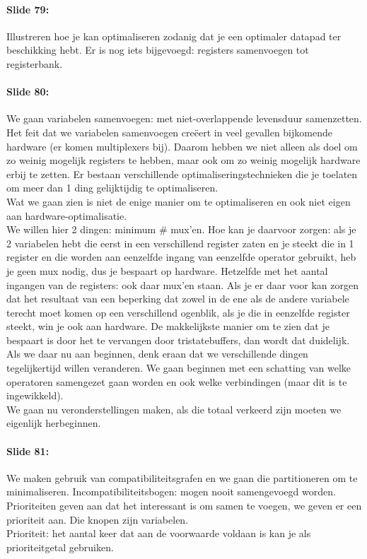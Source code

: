 \documentclass[10pt,a4paper]{book}
\begin{document}
\paragraph{Slide 79:} Illustreren hoe je kan optimaliseren zodanig dat je een optimaler datapad ter beschikking hebt. Er is nog iets bijgevoegd: registers samenvoegen tot registerbank.

\paragraph{Slide 80:} We gaan variabelen samenvoegen: met niet-overlappende levensduur samenzetten. Het feit dat we variabelen samenvoegen cre\"eert in veel gevallen bijkomende hardware (er komen multiplexers bij). Daarom hebben we niet alleen als doel om zo weinig mogelijk registers te hebben, maar ook om zo weinig mogelijk hardware erbij te zetten. Er bestaan verschillende optimaliseringstechnieken die je toelaten om meer dan 1 ding gelijktijdig te optimaliseren.\\
Wat we gaan zien is niet de enige manier om te optimaliseren en ook niet eigen aan hardware-optimalisatie.\\
We willen hier 2 dingen: minimum \# mux'en. Hoe kan je daarvoor zorgen: als je 2 variabelen hebt die eerst in een verschillend register zaten en je steekt die in 1 register en die worden aan eenzelfde ingang van eenzelfde operator gebruikt, heb je geen mux nodig, dus je bespaart op hardware. Hetzelfde met het aantal ingangen van de registers: ook daar mux'en staan. Als je er daar voor kan zorgen dat het resultaat van een beperking dat zowel in de ene als de andere variabele terecht moet komen op een verschillend ogenblik, als je die in eenzelfde register steekt, win je ook aan hardware. De makkelijkste manier om te zien dat je bespaart is door het te vervangen door tristatebuffers, dan wordt dat duidelijk.\\
Als we daar nu aan beginnen, denk eraan dat we verschillende dingen tegelijkertijd willen veranderen. We gaan beginnen met een schatting van welke operatoren samengezet gaan worden en ook welke verbindingen (maar dit is te ingewikkeld).\\
We gaan nu veronderstellingen maken, als die totaal verkeerd zijn moeten we eigenlijk herbeginnen.

\paragraph{Slide 81:} We maken gebruik van compatibiliteitsgrafen en we gaan die partitioneren om te minimaliseren. Incompatibiliteitsbogen: mogen nooit samengevoegd worden. Prioriteiten geven aan dat het interessant is om samen te voegen, we geven er een prioriteit aan. Die knopen zijn variabelen.\\
Prioriteit: het aantal keer dat aan de voorwaarde voldaan is kan je als prioriteitgetal gebruiken.
\end{document}
